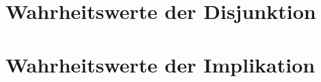\documentclass[main.tex]{subfiles}
\begin{document}
\section{Wahrheitswerte der Disjunktion}

\FormulaThmAuto{\top\lor \top \eqvdash \top}
\begin{tabproofsplit}
  \proofpart{$\vdash$}
  \closeproofpart

  \proofpart{$\dashv$}
  \closeproofpart
\end{tabproofsplit}

\FormulaThmAuto{\top\lor \bot \eqvdash \top}
\begin{tabproofsplit}
  \proofpart{$\vdash$}
    \proofstep{}{\top}{\FormulaRefAuto{\top}}
  \closeproofpart

  \proofpart{$\dashv$}
  \closeproofpart
\end{tabproofsplit}

\FormulaThmAuto{\bot\lor \top \eqvdash \top}
\begin{tabproofsplit}
  \proofpart{$\vdash$}
    \proofstep{}{\top}{\FormulaRefAuto{\top}}
  \closeproofpart

  \proofpart{$\dashv$}
  \closeproofpart
\end{tabproofsplit}

\FormulaThmAuto{\bot\lor \bot \eqvdash \bot}
\begin{tabproofsplit}
  \proofpart{$\vdash$}
  \closeproofpart

  \proofpart{$\dashv$}
  \closeproofpart
\end{tabproofsplit}

\section{Wahrheitswerte der Implikation}
\end{document}

